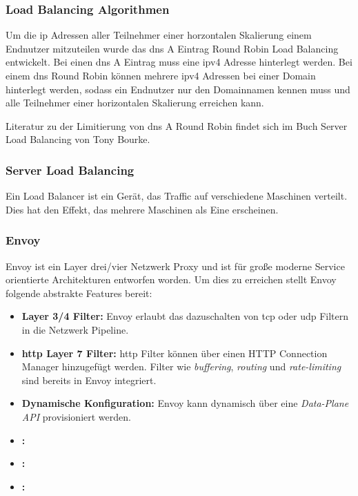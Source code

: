 \subsubsection{Load Balancing Algorithmen}

 \label{s:dns-round-robin}
Um die \ac{ip} Adressen aller Teilnehmer einer horzontalen Skalierung einem Endnutzer mitzuteilen wurde das \ac{dns} A Eintrag Round Robin Load Balancing entwickelt. Bei einen \ac{dns} A Eintrag muss eine \ac{ip}v4 Adresse hinterlegt werden. Bei einem \ac{dns} Round Robin können mehrere \ac{ip}v4 Adressen bei einer Domain hinterlegt werden, sodass ein Endnutzer nur den Domainnamen kennen muss und alle Teilnehmer einer horizontalen Skalierung erreichen kann.

Literatur zu der Limitierung von \ac{dns} A Round Robin findet sich im Buch Server Load Balancing von Tony Bourke.\cite{bourkeServerLoadBalancing2001}


\subsubsection{Server Load Balancing}
Ein Load Balancer ist ein Gerät, das Traffic auf verschiedene Maschinen verteilt. Dies hat den Effekt, das mehrere Maschinen als Eine erscheinen.
\cite{bourkeServerLoadBalancing2001}

\subsubsection{Envoy} \label{s:envoy}
Envoy ist ein Layer drei/vier Netzwerk Proxy und ist für gro{\ss}e moderne Service orientierte Architekturen entworfen worden. Um dies zu erreichen stellt Envoy folgende abstrakte Features bereit:
\begin{itemize}
    \item \textbf{Layer 3/4 Filter:} Envoy erlaubt das dazuschalten von \acs{tcp} oder \acs{udp} Filtern in die Netzwerk Pipeline.
    \item \textbf{\acs{http} Layer 7 Filter:} \acs{http} Filter können über einen HTTP Connection Manager hinzugefügt werden. Filter wie \textit{buffering}, \textit{routing} und \textit{rate-limiting} sind bereits in Envoy integriert.
    \item \textbf{Dynamische Konfiguration:} Envoy kann dynamisch über eine \textit{Data-Plane API} provisioniert werden.
    \item \textbf{:}
    \item \textbf{:}
    \item \textbf{:}
\end{itemize}
\cite{WhatEnvoyEnvoy}

